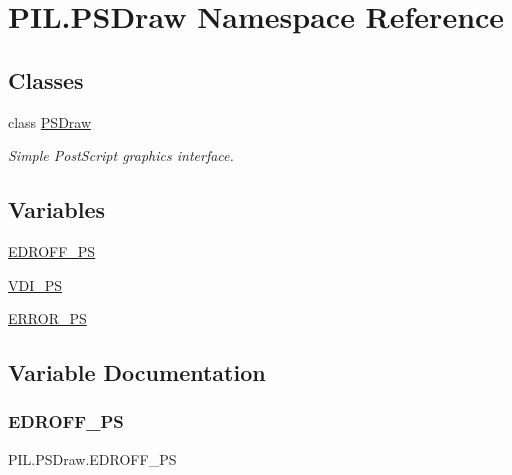 \hypertarget{namespacePIL_1_1PSDraw}{}\section{P\+I\+L.\+P\+S\+Draw Namespace Reference}
\label{namespacePIL_1_1PSDraw}
\subsection*{Classes}
\begin{DoxyCompactItemize}
\item 
class \hyperlink{classPIL_1_1PSDraw_1_1PSDraw}{P\+S\+Draw}
\begin{DoxyCompactList}\small\item\em Simple Post\+Script graphics interface. \end{DoxyCompactList}\end{DoxyCompactItemize}
\subsection*{Variables}
\begin{DoxyCompactItemize}
\item 
\hyperlink{namespacePIL_1_1PSDraw_acaa11fcf66a849f6aed31cbf389dd3b1}{E\+D\+R\+O\+F\+F\+\_\+\+PS}
\item 
\hyperlink{namespacePIL_1_1PSDraw_ab413f3779b71e5421db91f61e9c3282f}{V\+D\+I\+\_\+\+PS}
\item 
\hyperlink{namespacePIL_1_1PSDraw_a714545c93ea7a18f24a8be49a3565abe}{E\+R\+R\+O\+R\+\_\+\+PS}
\end{DoxyCompactItemize}


\subsection{Variable Documentation}
\mbox{\label{namespacePIL_1_1PSDraw_acaa11fcf66a849f6aed31cbf389dd3b1}} 
\subsubsection{\texorpdfstring{E\+D\+R\+O\+F\+F\+\_\+\+PS}{EDROFF\_PS}}
{\footnotesize\ttfamily P\+I\+L.\+P\+S\+Draw.\+E\+D\+R\+O\+F\+F\+\_\+\+PS}


